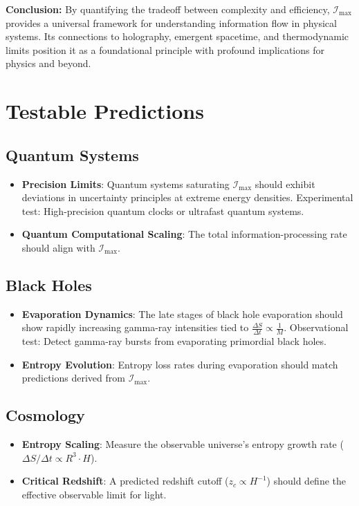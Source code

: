 \documentclass[12pt]{article}
\begin{document}
\textbf{Conclusion:} By quantifying the tradeoff between complexity and efficiency, \( \mathcal{I}_{\text{max}} \) provides a universal framework for understanding information flow in physical systems. Its connections to holography, emergent spacetime, and thermodynamic limits position it as a foundational principle with profound implications for physics and beyond.



\section{Testable Predictions}
\subsection{Quantum Systems}
\begin{itemize}
    \item \textbf{Precision Limits}: Quantum systems saturating \( \mathcal{I}_{\text{max}} \) should exhibit deviations in uncertainty principles at extreme energy densities. Experimental test: High-precision quantum clocks or ultrafast quantum systems.
    \item \textbf{Quantum Computational Scaling}: The total information-processing rate should align with \( \mathcal{I}_{\text{max}} \).
\end{itemize}

\subsection{Black Holes}
\begin{itemize}
    \item \textbf{Evaporation Dynamics}: The late stages of black hole evaporation should show rapidly increasing gamma-ray intensities tied to \( \frac{\Delta S}{\Delta t} \propto \frac{1}{M} \). Observational test: Detect gamma-ray bursts from evaporating primordial black holes.
    \item \textbf{Entropy Evolution}: Entropy loss rates during evaporation should match predictions derived from \( \mathcal{I}_{\text{max}} \).
\end{itemize}

\subsection{Cosmology}
\begin{itemize}
    \item \textbf{Entropy Scaling}: Measure the observable universe’s entropy growth rate (\( \Delta S / \Delta t \propto R^3 \cdot H \)).
    \item \textbf{Critical Redshift}: A predicted redshift cutoff (\( z_c \propto H^{-1} \)) should define the effective observable limit for light.
\end{itemize}
\end{document}
